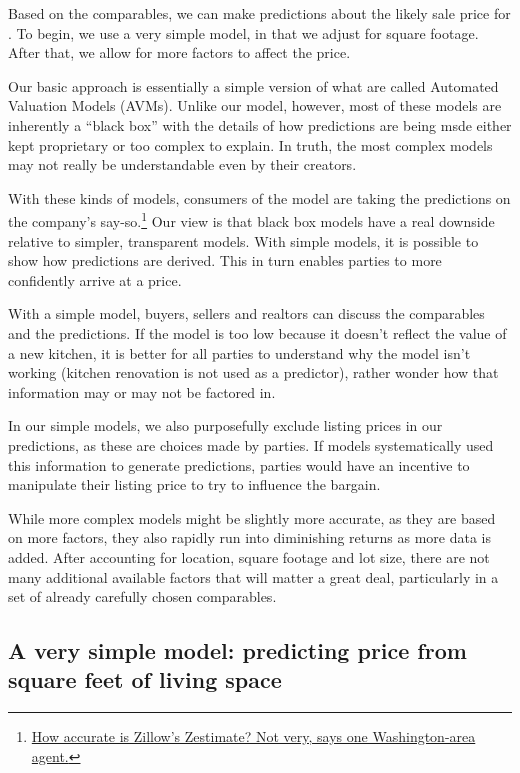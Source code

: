 \documentclass[
12pt, %
letterpaper, %
oneside, %
headinclude,footinclude, %
BCOR5mm, %
]{scrartcl}
\begin{document}
Based on the comparables, we can make predictions about the likely sale price for \PropertyName{}. 
To begin, we use a very simple model, in that we adjust for square footage.
After that, we allow for more factors to affect the price.

Our basic approach is essentially a simple version of what are called Automated Valuation Models (AVMs).
Unlike our model, however, most of these models are inherently a ``black box'' with the details of how predictions are being msde either kept proprietary or too complex to explain.
In truth, the most complex models may not really be understandable even by their creators. 

With these kinds of models, consumers of the model are taking the predictions on the company's say-so.\footnote{\href{https://www.washingtonpost.com/news/where-we-live/wp/2014/06/10/how-accurate-is-zillows-zestimate-not-very-says-one-washington-area-agent/?noredirect=on&utm_term=.e3453c7b3677}{How accurate is Zillow's Zestimate? Not very, says one Washington-area agent.}
}
Our view is that black box models have a real downside relative to simpler, transparent models.
With simple models, it is possible to show how predictions are derived.
This in turn enables parties to more confidently arrive at a price.

With a simple model, buyers, sellers and realtors can discuss the comparables and the predictions.
If the model is too low because it doesn't reflect the value of a new kitchen, it is better for all parties to understand why the model isn't working (kitchen renovation is not used as a predictor), rather wonder how that information may or may not be factored in.

In our simple models, we also purposefully exclude listing prices in our predictions, as these are choices made by parties.
If models systematically used this information to generate predictions, parties would have an incentive to manipulate their listing price to try to influence the bargain. 

While more complex models might be slightly more accurate, as they are based on more factors, they also rapidly run into diminishing returns as more data is added.
After accounting for location, square footage and lot size, there are not many additional available factors that will matter a great deal, particularly in a set of already carefully chosen comparables.

\subsection{A very simple model: predicting price from square feet of living space}
\end{document}

